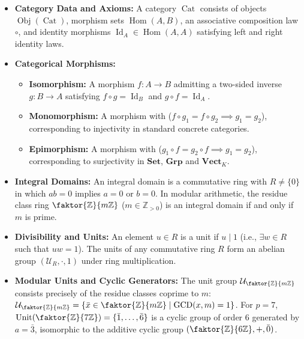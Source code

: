 \begin{overview}
\begin{itemize}
    \item \textbf{Category Data and Axioms:} A category $\operatorname{Cat}$ consists of objects $\operatorname{Obj}(\operatorname{Cat})$, morphism sets $\operatorname{Hom}(A, B)$, an associative composition law $\circ$, and identity morphisms $\operatorname{Id}_A \in \operatorname{Hom}(A, A)$ satisfying left and right identity laws.
    \item \textbf{Categorical Morphisms:}
    \begin{itemize}
        \item \textbf{Isomorphism:} A morphism $f \colon A \to B$ admitting a two-sided inverse $g \colon B \to A$ satisfying $f \circ g = \operatorname{Id}_B$ and $g \circ f = \operatorname{Id}_A$.
        \item \textbf{Monomorphism:} A morphism with ($f \circ g_1 = f \circ g_2 \implies g_1 = g_2$), corresponding to injectivity in standard concrete categories.
        \item \textbf{Epimorphism:} A morphism with ($g_1 \circ f = g_2 \circ f \implies g_1 = g_2$), corresponding to surjectivity in $\mathbf{Set}$, $\mathbf{Grp}$ and $\mathbf{Vect}_K$.
    \end{itemize}
    \item \textbf{Integral Domains:} An integral domain is a commutative ring with $R \neq \{0\}$ in which $ab = 0$ implies $a = 0$ or $b = 0$. In modular arithmetic, the residue class ring $\faktor{\mathbb{Z}}{m\mathbb{Z}}$ ($m \in \mathbb{Z}_{>0}$) is an integral domain if and only if $m$ is prime.
    \item \textbf{Divisibility and Units:} An element $u \in R$ is a unit if $u \mid 1$ (i.e., $\exists w \in R$ such that $uw = 1$). The units of any commutative ring $R$ form an abelian group $(\mathcal{U}_R, \cdot, 1)$ under ring multiplication.
    \item \textbf{Modular Units and Cyclic Generators:} The unit group $\mathcal{U}_{\faktor{\mathbb{Z}}{m\mathbb{Z}}}$ consists precisely of the residue classes coprime to $m$: $\mathcal{U}_{\faktor{\mathbb{Z}}{m\mathbb{Z}}} = \{\bar{x} \in \faktor{\mathbb{Z}}{m\mathbb{Z}} \mid \operatorname{GCD}(x, m) = 1\}$. For $p = 7$, $\operatorname{Unit}(\faktor{\mathbb{Z}}{7\mathbb{Z}}) = \{\bar{1}, \dots, \bar{6}\}$ is a cyclic group of order $6$ generated by $a = \bar{3}$, isomorphic to the additive cyclic group $(\faktor{\mathbb{Z}}{6\mathbb{Z}}, +, \bar{0})$.
\end{itemize}
\end{overview}
